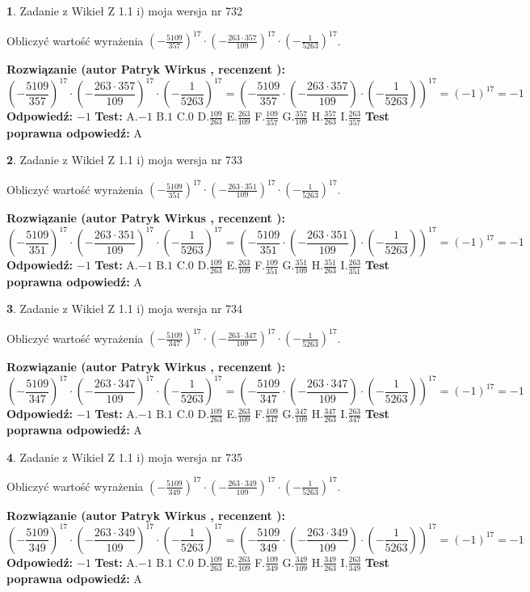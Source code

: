 \documentclass[12pt, a4paper]{article}
\theoremstyle{definition} %
\newtheorem{zad}{}
\newcommand{\zadStart}[1]{\begin{zad}#1\newline}
\newcommand{\zadStop}{\end{zad}}
\newcommand{\rozwStart}[2]{\noindent \textbf{Rozwiązanie (autor #1 , recenzent #2): }\newline}
\newcommand{\rozwStop}{\newline}
\newcommand{\odpStart}{\noindent \textbf{Odpowiedź:}\newline}
\newcommand{\odpStop}{\newline}
\newcommand{\testStart}{\noindent \textbf{Test:}\newline}
\newcommand{\testStop}{\newline}
\newcommand{\kluczStart}{\noindent \textbf{Test poprawna odpowiedź:}\newline}
\newcommand{\kluczStop}{\newline}
\begin{document}
\zadStart{Zadanie z Wikieł Z 1.1 i) moja wersja nr 732}

Obliczyć wartość wyrażenia $(-\frac{5109}{357})^{17} \cdot (-\frac{263 \cdot 357}{109})^{17} \cdot (-\frac{1}{5263})^{17}$.
\zadStop
\rozwStart{Patryk Wirkus}{}
$$(-\frac{5109}{357})^{17} \cdot (-\frac{263 \cdot 357}{109})^{17} \cdot (-\frac{1}{5263})^{17} = (-\frac{5109}{357} \cdot (-\frac{263 \cdot 357}{109}) \cdot (-\frac{1}{5263}))^{17} = (-1)^{17} = -1$$
\rozwStop
\odpStart
$-1$
\odpStop
\testStart
A.$-1$ B.$1$ C.$0$ D.$\frac{109}{263}$ E.$\frac{263}{109}$
F.$\frac{109}{357}$ G.$\frac{357}{109}$
H.$\frac{357}{263}$
I.$\frac{263}{357}$
\testStop
\kluczStart
A
\kluczStop



\zadStart{Zadanie z Wikieł Z 1.1 i) moja wersja nr 733}

Obliczyć wartość wyrażenia $(-\frac{5109}{351})^{17} \cdot (-\frac{263 \cdot 351}{109})^{17} \cdot (-\frac{1}{5263})^{17}$.
\zadStop
\rozwStart{Patryk Wirkus}{}
$$(-\frac{5109}{351})^{17} \cdot (-\frac{263 \cdot 351}{109})^{17} \cdot (-\frac{1}{5263})^{17} = (-\frac{5109}{351} \cdot (-\frac{263 \cdot 351}{109}) \cdot (-\frac{1}{5263}))^{17} = (-1)^{17} = -1$$
\rozwStop
\odpStart
$-1$
\odpStop
\testStart
A.$-1$ B.$1$ C.$0$ D.$\frac{109}{263}$ E.$\frac{263}{109}$
F.$\frac{109}{351}$ G.$\frac{351}{109}$
H.$\frac{351}{263}$
I.$\frac{263}{351}$
\testStop
\kluczStart
A
\kluczStop



\zadStart{Zadanie z Wikieł Z 1.1 i) moja wersja nr 734}

Obliczyć wartość wyrażenia $(-\frac{5109}{347})^{17} \cdot (-\frac{263 \cdot 347}{109})^{17} \cdot (-\frac{1}{5263})^{17}$.
\zadStop
\rozwStart{Patryk Wirkus}{}
$$(-\frac{5109}{347})^{17} \cdot (-\frac{263 \cdot 347}{109})^{17} \cdot (-\frac{1}{5263})^{17} = (-\frac{5109}{347} \cdot (-\frac{263 \cdot 347}{109}) \cdot (-\frac{1}{5263}))^{17} = (-1)^{17} = -1$$
\rozwStop
\odpStart
$-1$
\odpStop
\testStart
A.$-1$ B.$1$ C.$0$ D.$\frac{109}{263}$ E.$\frac{263}{109}$
F.$\frac{109}{347}$ G.$\frac{347}{109}$
H.$\frac{347}{263}$
I.$\frac{263}{347}$
\testStop
\kluczStart
A
\kluczStop



\zadStart{Zadanie z Wikieł Z 1.1 i) moja wersja nr 735}

Obliczyć wartość wyrażenia $(-\frac{5109}{349})^{17} \cdot (-\frac{263 \cdot 349}{109})^{17} \cdot (-\frac{1}{5263})^{17}$.
\zadStop
\rozwStart{Patryk Wirkus}{}
$$(-\frac{5109}{349})^{17} \cdot (-\frac{263 \cdot 349}{109})^{17} \cdot (-\frac{1}{5263})^{17} = (-\frac{5109}{349} \cdot (-\frac{263 \cdot 349}{109}) \cdot (-\frac{1}{5263}))^{17} = (-1)^{17} = -1$$
\rozwStop
\odpStart
$-1$
\odpStop
\testStart
A.$-1$ B.$1$ C.$0$ D.$\frac{109}{263}$ E.$\frac{263}{109}$
F.$\frac{109}{349}$ G.$\frac{349}{109}$
H.$\frac{349}{263}$
I.$\frac{263}{349}$
\testStop
\kluczStart
A
\kluczStop
\end{document}
